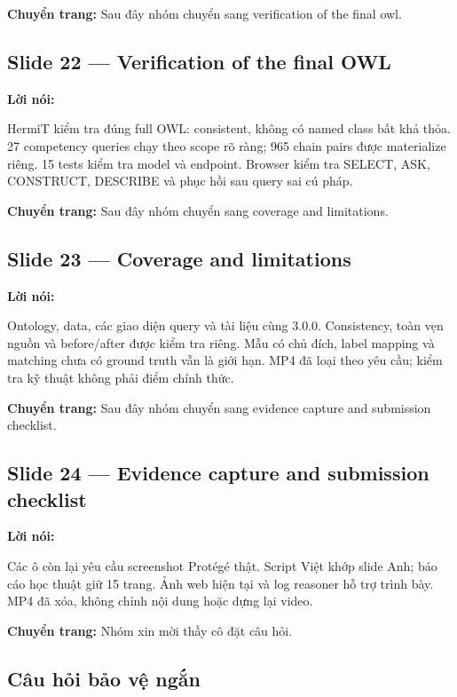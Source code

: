 \documentclass[
  11pt,
]{article}
\begin{document}
\textbf{Chuyển trang:} Sau đây nhóm chuyển sang verification of the
final owl.

\subsection{Slide 22 --- Verification of the final
OWL}\label{slide-22-verification-of-the-final-owl}

\textbf{Lời nói:}

HermiT kiểm tra đúng full OWL: consistent, không có named class bất khả
thỏa. 27 competency queries chạy theo scope rõ ràng; 965 chain pairs
được materialize riêng. 15 tests kiểm tra model và endpoint. Browser
kiểm tra SELECT, ASK, CONSTRUCT, DESCRIBE và phục hồi sau query sai cú
pháp.

\textbf{Chuyển trang:} Sau đây nhóm chuyển sang coverage and
limitations.

\subsection{Slide 23 --- Coverage and
limitations}\label{slide-23-coverage-and-limitations}

\textbf{Lời nói:}

Ontology, data, các giao diện query và tài liệu cùng 3.0.0. Consistency,
toàn vẹn nguồn và before/after được kiểm tra riêng. Mẫu có chủ đích,
label mapping và matching chưa có ground truth vẫn là giới hạn. MP4 đã
loại theo yêu cầu; kiểm tra kỹ thuật không phải điểm chính thức.

\textbf{Chuyển trang:} Sau đây nhóm chuyển sang evidence capture and
submission checklist.

\subsection{Slide 24 --- Evidence capture and submission
checklist}\label{slide-24-evidence-capture-and-submission-checklist}

\textbf{Lời nói:}

Các ô còn lại yêu cầu screenshot Protégé thật. Script Việt khớp slide
Anh; báo cáo học thuật giữ 15 trang. Ảnh web hiện tại và log reasoner hỗ
trợ trình bày. MP4 đã xóa, không chỉnh nội dung hoặc dựng lại video.

\textbf{Chuyển trang:} Nhóm xin mời thầy cô đặt câu hỏi.

\subsection{Câu hỏi bảo vệ
ngắn}\label{cuxe2u-hux1ecfi-bux1ea3o-vux1ec7-ngux1eafn}
\end{document}
